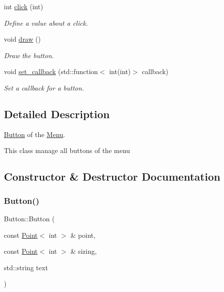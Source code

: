 \begin{DoxyCompactItemize}
int \hyperlink{classButton_af6a02022f77e1809a90cb6159c1a1536}{click} (int)
\begin{DoxyCompactList}\small\item\em Define a value about a click. \end{DoxyCompactList}\item 
\mbox{\label{classButton_a0380207dc9e4edcd0272207a39c7cdeb}} 
void \hyperlink{classButton_a0380207dc9e4edcd0272207a39c7cdeb}{draw} ()
\begin{DoxyCompactList}\small\item\em Draw the button. \end{DoxyCompactList}\item 
void \hyperlink{classButton_aff79964a98ce6c76d0ece8502a830985}{set\+\_\+callback} (std\+::function$<$ int(int)$>$ callback)
\begin{DoxyCompactList}\small\item\em Set a callback for a button. \end{DoxyCompactList}\end{DoxyCompactItemize}


\subsection{Detailed Description}
\hyperlink{classButton}{Button} of the \hyperlink{classMenu}{Menu}. 

This class manage all buttons of the menu 

\subsection{Constructor \& Destructor Documentation}
\mbox{\label{classButton_aaa8e2182b5ddda43df9a959815ea08bc}} 
\subsubsection{\texorpdfstring{Button()}{Button()}\hspace{0.1cm}{\footnotesize\ttfamily [1/2]}}
{\footnotesize\ttfamily Button\+::\+Button (\begin{DoxyParamCaption}\item[{const \hyperlink{classPoint}{Point}$<$ int $>$ \&}]{point,  }\item[{const \hyperlink{classPoint}{Point}$<$ int $>$ \&}]{sizing,  }\item[{std\+::string}]{text }\end{DoxyParamCaption})}



